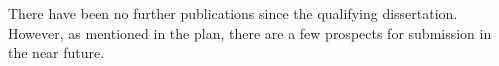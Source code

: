 There have been no further publications since the qualifying
dissertation. However, as mentioned in the plan, there are a few
prospects for submission in the near future.
